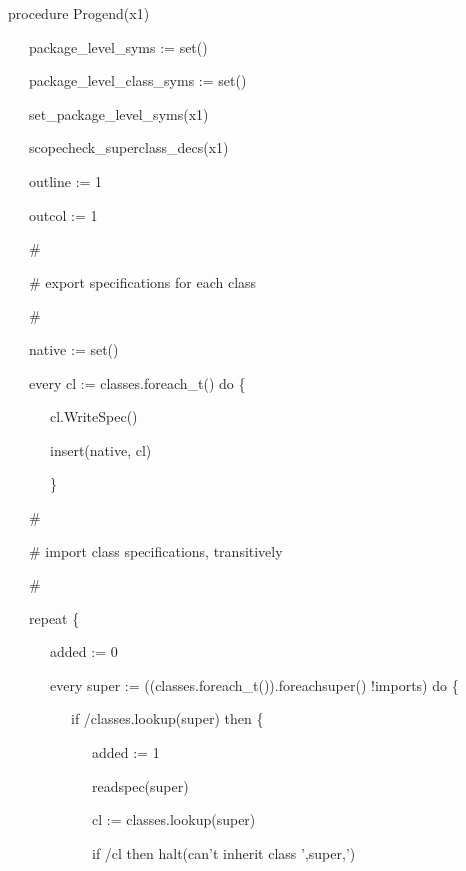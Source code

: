 {\ttfamily\mdseries
procedure Progend(x1)}


\bigskip

{\ttfamily\mdseries
\ \ \ package\_level\_syms := set()}

{\ttfamily\mdseries
\ \ \ package\_level\_class\_syms := set()}

{\ttfamily\mdseries
\ \ \ set\_package\_level\_syms(x1)}

{\ttfamily\mdseries
\ \ \ scopecheck\_superclass\_decs(x1)}


\bigskip

{\ttfamily\mdseries
\ \ \ outline := 1}

{\ttfamily\mdseries
\ \ \ outcol := 1}

{\ttfamily\mdseries
\ \ \ \#}

{\ttfamily\mdseries
\ \ \ \# export specifications for each class}

{\ttfamily\mdseries
\ \ \ \#}

{\ttfamily\mdseries
\ \ \ native := set()}

{\ttfamily\mdseries
\ \ \ every cl := classes.foreach\_t() do \{}

{\ttfamily\mdseries
\ \ \ \ \ \ cl.WriteSpec()}

{\ttfamily\mdseries
\ \ \ \ \ \ insert(native, cl)}

{\ttfamily\mdseries
\ \ \ \ \ \ \}}

{\ttfamily\mdseries
\ \ \ \#}

{\ttfamily\mdseries
\ \ \ \# import class specifications, transitively}

{\ttfamily\mdseries
\ \ \ \#}

{\ttfamily\mdseries
\ \ \ repeat \{}

{\ttfamily\mdseries
\ \ \ \ \ \ added := 0}

{\ttfamily\mdseries
\ \ \ \ \ \ every super := ((classes.foreach\_t()).foreachsuper() {\textbar} !imports) do \{}

{\ttfamily\mdseries
\ \ \ \ \ \ \ \ \ if /classes.lookup(super) then \{}

{\ttfamily\mdseries
\ \ \ \ \ \ \ \ \ \ \ \ added := 1}

{\ttfamily\mdseries
\ \ \ \ \ \ \ \ \ \ \ \ readspec(super)}

{\ttfamily\mdseries
\ \ \ \ \ \ \ \ \ \ \ \ cl := classes.lookup(super)}

{\ttfamily\mdseries
\ \ \ \ \ \ \ \ \ \ \ \ if /cl then halt({\textquotedbl}can't inherit class
'{\textquotedbl},super,{\textquotedbl}'{\textquotedbl})}

